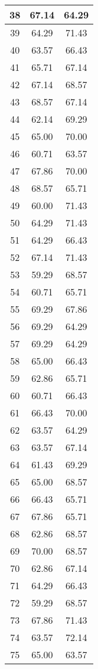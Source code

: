 \documentclass[11pt]{article}
\begin{document}
\begin{longtable}[c]{| c | c |c |}
38 & 67.14 & 64.29 \\ \hline
39 & 64.29 & 71.43 \\ \hline
40 & 63.57 & 66.43 \\ \hline
41 & 65.71 & 67.14 \\ \hline
42 & 67.14 & 68.57 \\ \hline
43 & 68.57 & 67.14 \\ \hline
44 & 62.14 & 69.29 \\ \hline
45 & 65.00 & 70.00 \\ \hline
46 & 60.71 & 63.57 \\ \hline
47 & 67.86 & 70.00 \\ \hline
48 & 68.57 & 65.71 \\ \hline
49 & 60.00 & 71.43 \\ \hline
50 & 64.29 & 71.43 \\ \hline
51 & 64.29 & 66.43 \\ \hline
52 & 67.14 & 71.43 \\ \hline
53 & 59.29 & 68.57 \\ \hline
54 & 60.71 & 65.71 \\ \hline
55 & 69.29 & 67.86 \\ \hline
56 & 69.29 & 64.29 \\ \hline
57 & 69.29 & 64.29 \\ \hline
58 & 65.00 & 66.43 \\ \hline
59 & 62.86 & 65.71 \\ \hline
60 & 60.71 & 66.43 \\ \hline
61 & 66.43 & 70.00 \\ \hline
62 & 63.57 & 64.29 \\ \hline
63 & 63.57 & 67.14 \\ \hline
64 & 61.43 & 69.29 \\ \hline
65 & 65.00 & 68.57 \\ \hline
66 & 66.43 & 65.71 \\ \hline
67 & 67.86 & 65.71 \\ \hline
68 & 62.86 & 68.57 \\ \hline
69 & 70.00 & 68.57 \\ \hline
70 & 62.86 & 67.14 \\ \hline
71 & 64.29 & 66.43 \\ \hline
72 & 59.29 & 68.57 \\ \hline
73 & 67.86 & 71.43 \\ \hline
74 & 63.57 & 72.14 \\ \hline
75 & 65.00 & 63.57 \\ \hline

\end{longtable}
\end{document}
